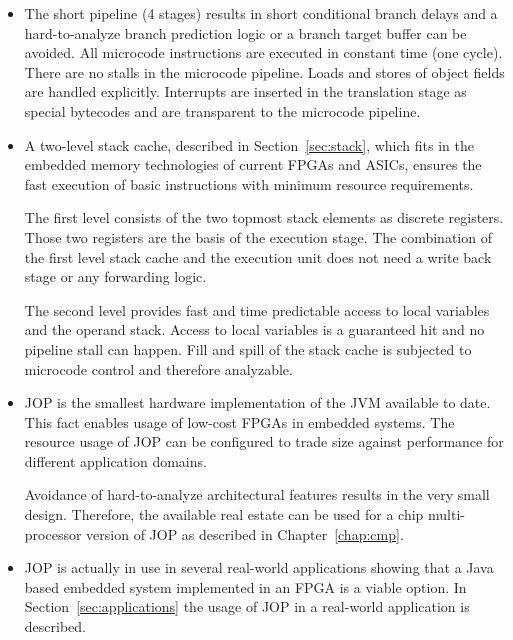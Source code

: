 \begin{itemize}
    \item The short pipeline (4 stages) results in short
        conditional branch delays and a hard-to-analyze branch
        prediction logic or a branch target buffer can be
        avoided. All microcode instructions are executed in
        constant time (one cycle). There are no stalls in the
        microcode pipeline. Loads and stores of object fields are
        handled explicitly. Interrupts are inserted in the
        translation stage as special bytecodes and are
        transparent to the microcode pipeline.


    \item A two-level stack cache, described in
        Section~\ref{sec:stack}, which fits in the embedded
        memory technologies of current FPGAs and ASICs, ensures
        the fast execution of basic instructions with minimum
        resource requirements.


The first level consists of the two topmost stack elements as
discrete registers. Those two registers are the basis of the
execution stage. The combination of the first level stack cache and
the execution unit does not need a write back stage or any
forwarding logic.


The second level provides fast and time predictable access to local
variables and the operand stack. Access to local variables is a
guaranteed hit and no pipeline stall can happen. Fill and spill of
the stack cache is subjected to microcode control and therefore
analyzable.


    \item
JOP is the smallest hardware implementation of the JVM available to
date. This fact enables usage of low-cost FPGAs in embedded systems.
The resource usage of JOP can be configured to trade size against
performance for different application domains.

Avoidance of hard-to-analyze architectural features results in
the very small design. Therefore, the available real estate can
be used for a chip multi-processor version of JOP as described in
Chapter~\ref{chap:cmp}.


    \item
JOP is actually in use in several real-world applications showing
that a Java based embedded system implemented in an FPGA is a viable
option. In Section~\ref{sec:applications} the usage of JOP in a
real-world application is described.

\end{itemize}

